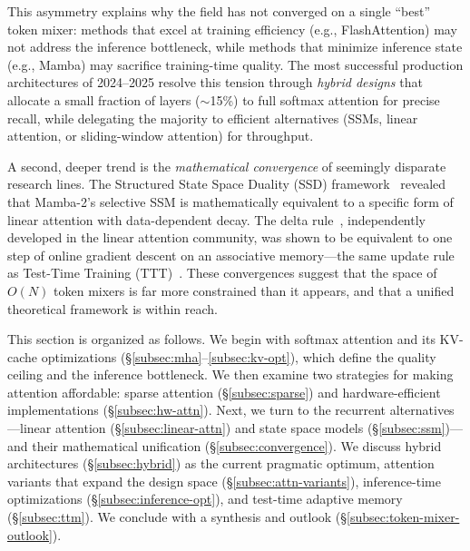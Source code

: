 \documentclass[11pt,a4paper]{article}
\begin{document}
This asymmetry explains why the field has not converged on a single ``best'' token mixer: methods that excel at training efficiency (e.g., FlashAttention) may not address the inference bottleneck, while methods that minimize inference state (e.g., Mamba) may sacrifice training-time quality.
The most successful production architectures of 2024--2025 resolve this tension through \emph{hybrid designs} that allocate a small fraction of layers (${\sim}$15\%) to full softmax attention for precise recall, while delegating the majority to efficient alternatives (SSMs, linear attention, or sliding-window attention) for throughput.

A second, deeper trend is the \emph{mathematical convergence} of seemingly disparate research lines.
The Structured State Space Duality (SSD) framework~\cite{dao2024mamba2} revealed that Mamba-2's selective SSM is mathematically equivalent to a specific form of linear attention with data-dependent decay.
The delta rule~\cite{yang2024deltanet}, independently developed in the linear attention community, was shown to be equivalent to one step of online gradient descent on an associative memory---the same update rule as Test-Time Training (TTT)~\cite{sun2024learning}.
These convergences suggest that the space of $O(N)$ token mixers is far more constrained than it appears, and that a unified theoretical framework is within reach.

This section is organized as follows.
We begin with softmax attention and its KV-cache optimizations (\S\ref{subsec:mha}--\ref{subsec:kv-opt}), which define the quality ceiling and the inference bottleneck.
We then examine two strategies for making attention affordable: sparse attention (\S\ref{subsec:sparse}) and hardware-efficient implementations (\S\ref{subsec:hw-attn}).
Next, we turn to the recurrent alternatives---linear attention (\S\ref{subsec:linear-attn}) and state space models (\S\ref{subsec:ssm})---and their mathematical unification (\S\ref{subsec:convergence}).
We discuss hybrid architectures (\S\ref{subsec:hybrid}) as the current pragmatic optimum, attention variants that expand the design space (\S\ref{subsec:attn-variants}), inference-time optimizations (\S\ref{subsec:inference-opt}), and test-time adaptive memory (\S\ref{subsec:ttm}).
We conclude with a synthesis and outlook (\S\ref{subsec:token-mixer-outlook}).


\end{document}
